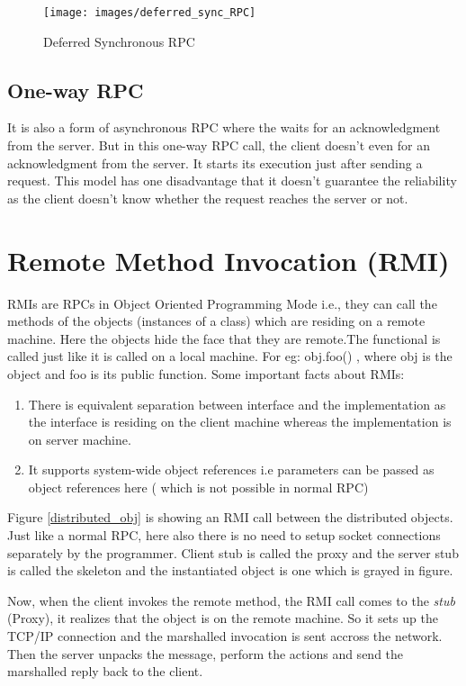 \documentclass[twoside]{article}
\begin{document}
\begin{figure}[h]
\begin{center}
\texttt{[image: images/deferred\_sync\_RPC]}
\caption{Deferred Synchronous RPC}
\end{center}
\end{figure}

\subsection{One-way RPC}

It is also a form of asynchronous RPC where the waits for an acknowledgment from the server. But in this one-way RPC call, the client doesn't even for an acknowledgment from the server. It starts its execution just after sending a request.
This model has one disadvantage that it doesn't guarantee the reliability as the client doesn't know whether the request reaches the server or not.

\section{Remote Method Invocation (RMI)}
RMIs are RPCs in Object Oriented Programming Mode i.e., they can call the methods of the objects (instances of a class) which are residing on a remote machine. Here the objects hide the face that they are remote.The functional is called just like it is called on a local machine. For eg: obj.foo() , where obj is the object and foo is its public function. Some important facts about RMIs: 
\begin{enumerate}
\item There is equivalent separation between interface and the implementation as the interface is residing on the client machine whereas the implementation is on server machine.
\item It supports system-wide object references i.e parameters can be passed as object references here ( which is not possible in normal RPC)
\end{enumerate}

Figure \ref{distributed_obj} is showing an RMI call between the distributed objects. Just like a normal RPC, here also there is no need to setup socket connections separately by the programmer. Client stub is called the proxy and the server stub is called the skeleton and the instantiated object is one which is grayed in figure.

Now, when the client invokes the remote method, the RMI call comes to the \textit{stub} (Proxy), it realizes that the object is on the remote machine. So it sets up the TCP/IP connection and the marshalled invocation is sent accross the network. Then the server unpacks the message, perform the actions and send the marshalled reply back to the client.
\end{document}
